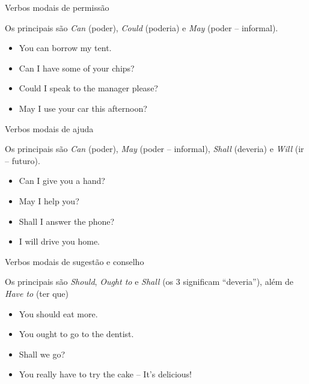 \documentclass[compress,mathserif]{beamer}
\begin{document}
\begin{frame}{Verbos modais de permissão}

Os principais são \textit{Can} (poder), \textit{Could} (poderia) e \textit{May} (poder – informal).

\vspace{0.5cm}

\begin{itemize}
    \item You can borrow my tent.
    \item Can I have some of your chips?
    \item Could I speak to the manager please?
    \item May I use your car this afternoon?
\end{itemize}

\end{frame}


\begin{frame}{Verbos modais de ajuda}

Os principais são \textit{Can} (poder), \textit{May} (poder – informal), \textit{Shall} (deveria) e \textit{Will} (ir – futuro).

\vspace{0.5cm}

\begin{itemize}
    \item Can I give you a hand?
    \item May I help you?
    \item Shall I answer the phone?
    \item I will drive you home.
\end{itemize}

\end{frame}


\begin{frame}{Verbos modais de sugestão e conselho}

Os principais são \textit{Should}, \textit{Ought to} e \textit{Shall} (os 3 significam “deveria”), além de \textit{Have to} (ter que)

\vspace{0.5cm}

\begin{itemize}
    \item You should eat more.
    \item You ought to go to the dentist.
    \item Shall we go?
    \item You really have to try the cake – It’s delicious!
\end{itemize}

\end{frame}
\end{document}
